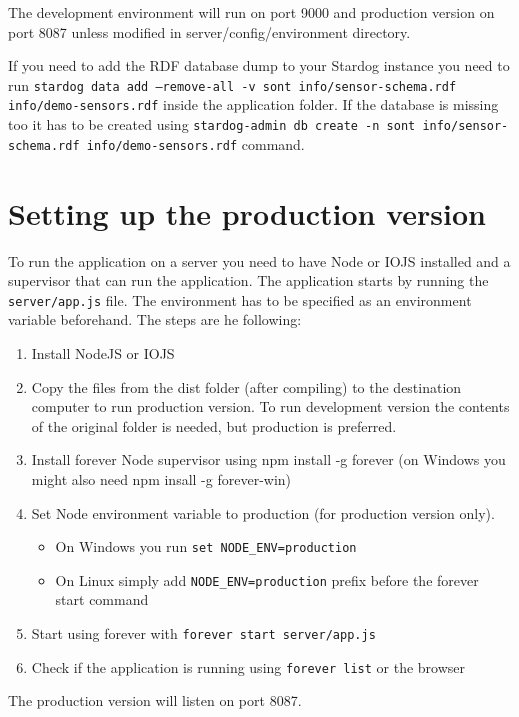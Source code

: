 The development environment will run on port 9000 and production version on port 8087 unless modified in server/config/environment directory.

If you need to add the RDF database dump to your Stardog instance you need to run \texttt{stardog data add --remove-all -v sont info/sensor-schema.rdf info/demo-sensors.rdf} inside the application folder. If the database is missing too it has to be created using \texttt{stardog-admin db create -n sont info/sensor-schema.rdf info/demo-sensors.rdf} command.

\section{Setting up the production version}

To run the application on a server you need to have Node or IOJS installed and a supervisor that can run the application. The application starts by running the \texttt{server/app.js} file. The environment has to be specified as an environment variable beforehand. The steps are he following:
\begin{enumerate}
\item Install NodeJS or IOJS
\item Copy the files from the dist folder (after compiling) to the destination computer to run production version. To run development version the contents of the original folder is needed, but production is preferred.
\item Install forever Node supervisor using npm install -g forever (on Windows you might also need npm insall -g forever-win)
\item Set Node environment variable to production (for production version only).
\begin{itemize}
\item On Windows you run \texttt{set NODE\_ENV=production}
\item On Linux simply add \texttt{NODE\_ENV=production} prefix before the forever start command
\end{itemize}
\item Start using forever with \texttt{forever start server/app.js}
\item Check if the application is running using \texttt{forever list} or the browser
\end{enumerate}
The production version will listen on port 8087.
\newpage
